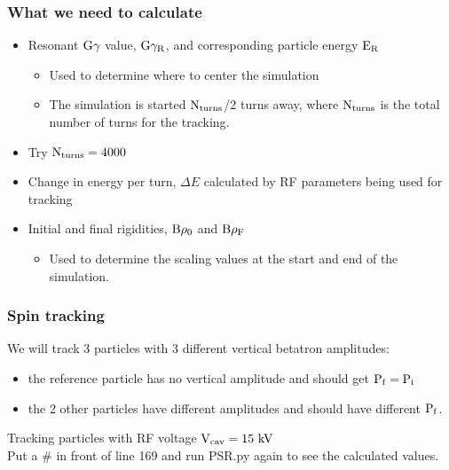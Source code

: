 \documentclass{beamer}
\begin{document}
\begin{frame}
\frametitle{What we need to calculate}

\begin{itemize}
\item Resonant $\rm G\gamma$ value, $\rm G\gamma_R$, and corresponding particle energy $\rm E_R$
\begin{itemize}
\item Used to determine where to center the simulation
\item The simulation is started $\rm N_{turns}$/2 turns away, where $\rm N_{turns}$ is the total number of turns for the tracking. 
\end{itemize}
\item Try $\rm N_{turns}=4000$
\item Change in energy per turn, $\Delta E$ calculated by RF parameters being used for tracking
\item Initial and final rigidities, $\rm B\rho_0$ and $\rm B\rho_F$
\begin{itemize}
\item Used to determine the scaling values at the start and end of the simulation.
\end{itemize}
\end{itemize}
\end{frame}

\begin{frame}
\frametitle{Spin tracking}
We will track 3 particles with 3 different vertical betatron amplitudes:
\begin{itemize}
\item the reference particle has no vertical amplitude and should get $\rm P_f=P_i$
\item the 2 other particles have different amplitudes and should have different $\rm P_f$.
\end{itemize}
Tracking particles with RF voltage $\rm V_{cav}=15~kV$\\

Put a \# in front of line 169 and run PSR.py again to see the calculated values.

\end{frame}
\end{document}
